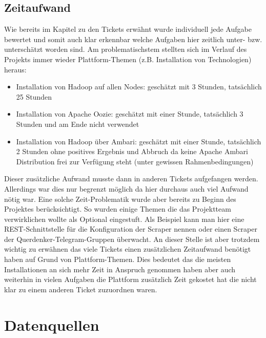 \documentclass[12pt,oneside,a4paper,parskip]{scrbook}
\begin{document}
\section{Zeitaufwand}
Wie bereits im Kapitel zu den Tickets erw\"ahnt wurde individuell jede Aufgabe bewertet und somit auch klar erkennbar welche Aufgaben hier zeitlich unter- bzw. untersch\"atzt worden sind. Am problematischstem stellten sich im Verlauf des Projekts immer wieder Plattform-Themen (z.B. Installation von Technologien) heraus:
\begin{itemize}
	\item Installation von Hadoop auf allen Nodes: gesch\"atzt mit 3 Stunden, tats\"achlich 25 Stunden
	\item Installation von Apache Oozie: gesch\"atzt mit einer Stunde, tats\"achlich 3 Stunden und am Ende nicht verwendet
	\item Installation von Hadoop \"uber Ambari: gesch\"atzt mit einer Stunde, tats\"achlich 2 Stunden ohne positives Ergebnis und Abbruch da keine Apache Ambari Distribution frei zur Verf\"ugung steht (unter gewissen Rahmenbedingungen)
\end{itemize}
Dieser zus\"atzliche Aufwand musste dann in anderen Tickets aufgefangen werden. Allerdings war dies nur begrenzt m\"oglich da hier durchaus auch viel Aufwand n\"otig war. \newline
Eine solche Zeit-Problematik wurde aber bereits zu Beginn des Projektes ber\"ucksichtigt. So wurden einige Themen die das Projektteam verwirklichen wollte als Optional eingestuft. Als Beispiel kann man hier eine REST-Schnittstelle f\"ur die Konfiguration der Scraper nennen oder einen Scraper der Querdenker-Telegram-Gruppen \"uberwacht. \newline
An dieser Stelle ist aber trotzdem wichtig zu erw\"ahnen das viele Tickets einen zus\"atzlichen Zeitaufwand ben\"otigt haben auf Grund von Plattform-Themen. Dies bedeutet das die meisten Installationen an sich mehr Zeit in Anspruch genommen haben aber auch weiterhin in vielen Aufgaben die Plattform zus\"atzlich Zeit gekostet hat die nicht klar zu einem anderen Ticket zuzuordnen waren.
\chapter{Datenquellen}
\end{document}
